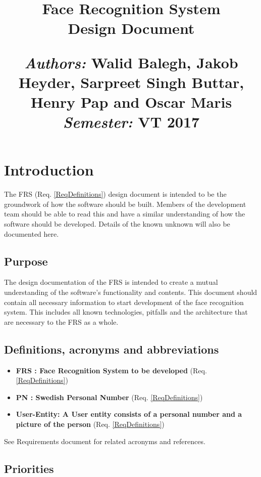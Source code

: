 \documentclass[a4paper,11pt]{article}
\title{
\vspace{-8cm}
\begin{flushleft}
    \vspace{10cm}
    \normalfont \normalsize
    \vspace{-1.3cm}
\end{flushleft}
\vspace{3cm}
\begin{flushleft}
    \huge Face Recognition System \\
    \LARGE  Design Document\\
\end{flushleft}
\null
\vfill
\begin{minipage}{\textwidth}
\begin{flushleft} \large
\emph{Authors:} Walid Balegh, Jakob Heyder, Sarpreet Singh Buttar, Henry \hspace{45pt} Pap and Oscar Maris \\ %
\emph{Semester:} VT 2017\\ %
\end{flushleft}
\end{minipage}
}
\date{}
\begin{document}
\maketitle

\newpage

\tableofcontents

\newpage


\section{Introduction}
The FRS (Req. \ref{ReqDefinitions}) design document is intended to be the groundwork of how the software should be built. Members of the development team should be able to read this and have a similar understanding of how the software should be developed. Details of the known unknown will also be documented here.

\subsection{Purpose}
The design documentation of the FRS is intended to create a mutual understanding of the software's functionality and contents. This document should contain all necessary information to start development of the face recognition system. This includes all known technologies, pitfalls and the architecture that are necessary to the FRS as a whole. 

\subsection{Definitions, acronyms and abbreviations}
\begin{itemize}
 
\item \textbf{FRS : Face Recognition System to be developed} (Req. \ref{ReqDefinitions})
\item \textbf{PN : Swedish Personal Number} (Req. \ref{ReqDefinitions})
\item \textbf{User-Entity: A User entity consists of a personal number and a picture of the person} (Req. \ref{ReqDefinitions})
\end{itemize}
 
See Requirements document for related acronyms and references.


\subsection{Priorities}
\end{document}
